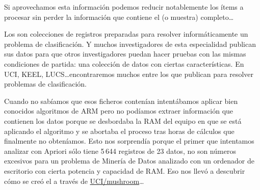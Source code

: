 Si aprovechamos esta información podemos reducir notablemente los ítems a procesar sin perder la información que contiene el \catalogo (o muestra) completo\ldots








%
%
%
%
%
%
%
%
%
%
%
%










Los \catalogos son colecciones de registros preparadas para resolver informáticamente un problema de clasificación. Y muchos investigadores de esta especialidad publican sus datos para que otros investigadores puedan hacer pruebas con las mismas condiciones de partida: una colección de datos con ciertas características. En UCI, KEEL, LUCS\ldots encontraremos muchos \catalogos entre los \datasets que publican para resolver problemas de clasificación.

Cuando no sabíamos que esos ficheros contenían \catalogoss intentábamos aplicar bien conocidos algoritmos de ARM pero no podíamos extraer información que contienen los datos porque se desbordaba la RAM del equipo en que se está aplicando el algoritmo y se abortaba el proceso tras horas de cálculos que finalmente no obteníamos. Esto nos sorprendía porque el primer \catalogos que intentamos analizar con Apriori sólo tiene 5\,644 registros de 23 datos, no son números excesivos para un problema de Minería de Datos analizado con un ordenador de escritorio con cierta potencia y capacidad de RAM. Eso nos llevó a descubrir cómo se creó el \catalogos a través de \url{UCI/mushroom}\ldots

